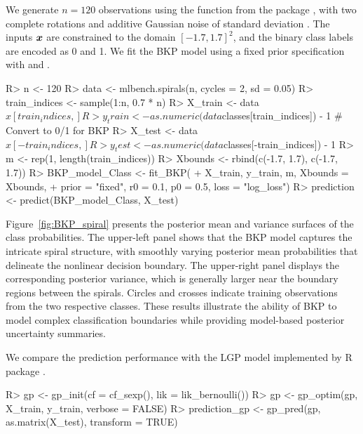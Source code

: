 \documentclass[article, shortnames]{jss}
\newcommand{\fct}[1]{\code{#1()}}
\renewcommand{\vec}[1]{\mbox{\boldmath ${#1}$}}
\begin{document}
We generate $n = 120$ observations using the \fct{mlbench.spirals} function from the  package  \citep{Leisch2024mlbench}, with two complete rotations and additive Gaussian noise of standard deviation . The inputs $\vec{x}$ are constrained to the domain $[-1.7, 1.7]^2$, and the binary class labels are encoded as 0 and 1. We fit the BKP model using a fixed prior specification with  and .

\begin{CodeChunk}
\begin{CodeInput}
R> n <- 120
R> data <- mlbench.spirals(n, cycles = 2, sd = 0.05)
R> train_indices <- sample(1:n, 0.7 * n)
R> X_train <- data$x[train_indices, ]
R> y_train <- as.numeric(data$classes[train_indices]) - 1 # Convert to 0/1 for BKP
R> X_test <- data$x[-train_indices, ]
R> y_test <- as.numeric(data$classes[-train_indices]) - 1 
R> m <- rep(1, length(train_indices))
R> Xbounds <- rbind(c(-1.7, 1.7), c(-1.7, 1.7)) 
R> BKP_model_Class <- fit_BKP(
+    X_train, y_train, m, Xbounds = Xbounds,
+    prior = "fixed", r0 = 0.1, p0 = 0.5, loss = "log_loss")
R> prediction <- predict(BKP_model_Class, X_test)
\end{CodeInput}
\end{CodeChunk} 

Figure~\ref{fig:BKP_spiral} presents the posterior mean and variance surfaces of the class probabilities. The upper-left panel shows that the BKP model captures the intricate spiral structure, with smoothly varying posterior mean probabilities that delineate the nonlinear decision boundary. The upper-right panel displays the corresponding posterior variance, which is generally larger near the boundary regions between the spirals. Circles and crosses indicate training observations from the two respective classes. These results illustrate the ability of BKP to model complex classification boundaries while providing model-based posterior uncertainty summaries.

We compare the prediction performance with the LGP model implemented by R package . 
\begin{CodeChunk}
\begin{CodeInput}
R> gp <- gp_init(cf = cf_sexp(), lik = lik_bernoulli())
R> gp <- gp_optim(gp, X_train, y_train, verbose = FALSE) 
R> prediction_gp <- gp_pred(gp, as.matrix(X_test), transform = TRUE)
\end{CodeInput}
\end{CodeChunk} 
\end{document}
